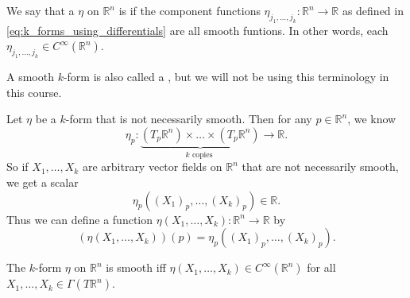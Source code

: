 \documentclass[notoc,notitlepage]{tufte-book}
\begin{document}
\begin{defn}\label{defn:smooth_k_forms_on_r_n_}
  We say that a  $\eta$ on $\mathbb{R}^n$ is  if the component
  functions $\eta_{j_1, \ldots, j_k} : \mathbb{R}^n \to \mathbb{R}$ as defined in 
  \cref{eq:k_forms_using_differentials} are all smooth funtions. In other words, each
  $\eta_{j_1, \ldots, j_k} \in C^\infty(\mathbb{R}^n)$.
\end{defn}

\begin{note}
  A smooth $k$-form is also called a , but we will not be using
  this terminology in this course.
\end{note}

Let $\eta$ be a $k$-form that is not necessarily smooth. Then for any $p \in \mathbb{R}^n$, we know
\begin{equation*}
  \eta_p : \underbrace{(T_p \mathbb{R}^n) \times \hdots \times (T_p \mathbb{R}^n)}_{k \text{ copies }} \to \mathbb{R}.
\end{equation*}
So if $X_1, \ldots, X_k$ are arbitrary vector fields on $\mathbb{R}^n$ that are not necessarily
smooth, we get a scalar
\begin{equation*}
  \eta_p((X_1)_p, \ldots, (X_k)_p) \in \mathbb{R}.
\end{equation*}
Thus we can define a function $\eta(X_1, \ldots, X_k) : \mathbb{R}^n \to \mathbb{R}$ by
\begin{equation}\label{eq:k_forms_without_basis}
  (\eta(X_1, \ldots, X_k))(p) = \eta_p((X_1)_p, \ldots, (X_k)_p).
\end{equation}

\begin{propo}\label{propo:equivalent_definition_of_smothness_of_k_forms}
  The $k$-form $\eta$ on $\mathbb{R}^n$ is smooth iff $\eta(X_1, \ldots, X_k) \in 
  C^\infty(\mathbb{R}^n)$ for all $X_1, \ldots, X_k \in \Gamma(T \mathbb{R}^n)$.
\end{propo}
\end{document}
